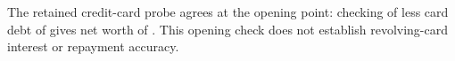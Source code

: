 The retained credit-card probe agrees at the opening point: checking of  less card debt of  gives net worth of . This opening check does not establish revolving-card interest or repayment accuracy.
